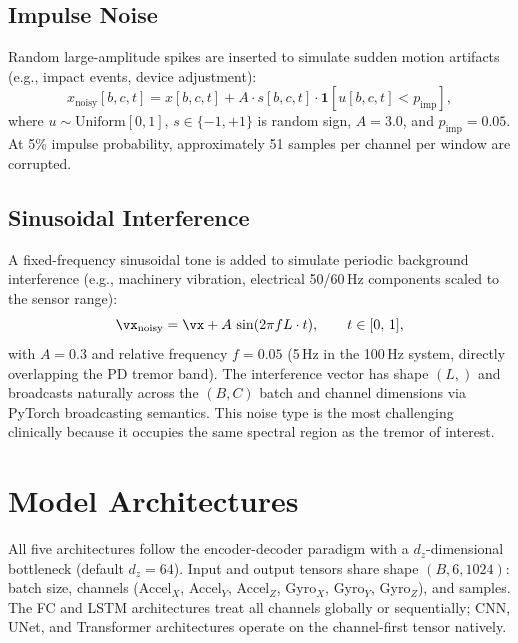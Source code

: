 \documentclass{article}
\begin{document}
\subsection{Impulse Noise}

Random large-amplitude spikes are inserted to simulate sudden
motion artifacts (e.g., impact events, device adjustment):
%
\begin{equation}
  x_{\text{noisy}}[b,c,t] = x[b,c,t] + A \cdot s[b,c,t] \cdot \mathbf{1}[u[b,c,t] < p_{\text{imp}}],
\end{equation}
%
where $u \sim \text{Uniform}[0,1]$, $s \in \{-1,+1\}$ is random sign,
$A = 3.0$, and $p_{\text{imp}} = 0.05$.
At 5\% impulse probability, approximately 51 samples per channel per window are
corrupted.

\subsection{Sinusoidal Interference}

A fixed-frequency sinusoidal tone is added to simulate periodic background
interference (e.g., machinery vibration, electrical 50/60\,Hz components
scaled to the sensor range):
%
\begin{equation}
  \vx_{\text{noisy}} = \vx + A\,\sin(2\pi f L \cdot t),
  \qquad t \in [0,\,1],
\end{equation}
%
with $A = 0.3$ and relative frequency $f = 0.05$ (5\,Hz in the 100\,Hz
system, directly overlapping the PD tremor band).
The interference vector has shape $(L,)$ and broadcasts naturally across the
$(B, C)$ batch and channel dimensions via PyTorch broadcasting semantics.
This noise type is the most challenging clinically because it occupies the
same spectral region as the tremor of interest.

\section{Model Architectures}
\label{sec:models}

All five architectures follow the encoder-decoder paradigm with a
$d_z$-dimensional bottleneck (default $d_z = 64$).
Input and output tensors share shape $(B, 6, 1024)$: batch size, channels
(Accel$_X$, Accel$_Y$, Accel$_Z$, Gyro$_X$, Gyro$_Y$, Gyro$_Z$),
and samples.
The FC and LSTM architectures treat all channels globally or sequentially;
CNN, UNet, and Transformer architectures operate on the channel-first
tensor natively.
\end{document}
